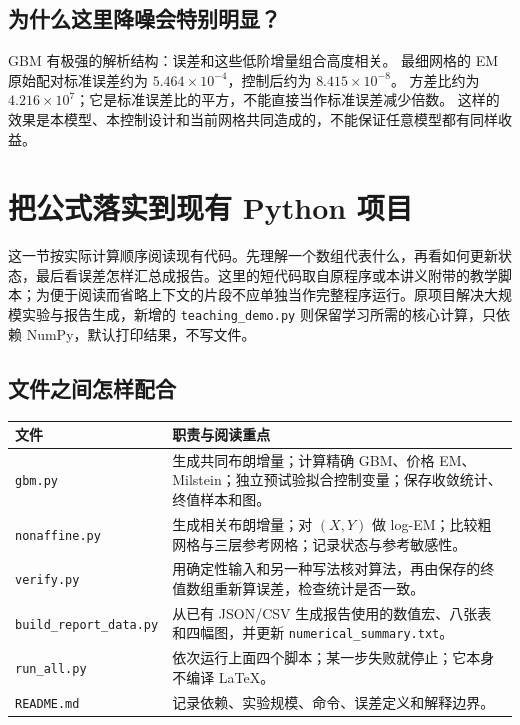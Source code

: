 \documentclass[11pt,a4paper,fontset=none]{ctexart}
\numberwithin{equation}{section}
\begin{document}
\subsection{为什么这里降噪会特别明显？}
GBM 有极强的解析结构：误差和这些低阶增量组合高度相关。
最细网格的 EM 原始配对标准误差约为 $5.464\times10^{-4}$，控制后约为 $8.415\times10^{-8}$。
方差比约为 $4.216\times10^7$；它是标准误差比的平方，不能直接当作标准误差减少倍数。
这样的效果是本模型、本控制设计和当前网格共同造成的，不能保证任意模型都有同样收益。



\section{把公式落实到现有 Python 项目}
\label{code:chapter}

这一节按实际计算顺序阅读现有代码。先理解一个数组代表什么，再看如何更新状态，最后看误差怎样汇总成报告。这里的短代码取自原程序或本讲义附带的教学脚本；为便于阅读而省略上下文的片段不应单独当作完整程序运行。原项目解决大规模实验与报告生成，新增的 \texttt{teaching\_demo.py} 则保留学习所需的核心计算，只依赖 NumPy，默认打印结果，不写文件。

\subsection{文件之间怎样配合}

\begin{center}
\small
\begin{tabularx}{\textwidth}{@{}lY@{}}
\toprule
文件 & 职责与阅读重点\\
\midrule
\texttt{gbm.py} & 生成共同布朗增量；计算精确 GBM、价格 EM、Milstein；独立预试验拟合控制变量；保存收敛统计、终值样本和图。\\
\texttt{nonaffine.py} & 生成相关布朗增量；对 $(X,Y)$ 做 log-EM；比较粗网格与三层参考网格；记录状态与参考敏感性。\\
\texttt{verify.py} & 用确定性输入和另一种写法核对算法，再由保存的终值数组重新算误差，检查统计是否一致。\\
\texttt{build\_report\_data.py} & 从已有 JSON/CSV 生成报告使用的数值宏、八张表和四幅图，并更新 \texttt{numerical\_summary.txt}。\\
\texttt{run\_all.py} & 依次运行上面四个脚本；某一步失败就停止；它本身不编译 \LaTeX。\\
\texttt{README.md} & 记录依赖、实验规模、命令、误差定义和解释边界。\\
\bottomrule
\end{tabularx}
\end{center}
\end{document}
